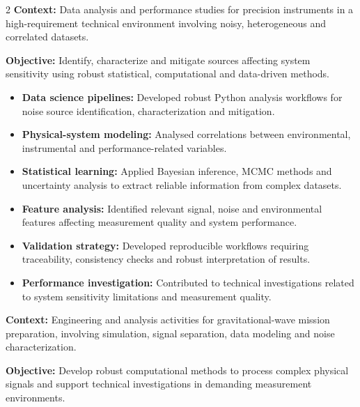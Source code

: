 \documentclass[8pt,a4paper,ragged2e,withhyper]{altacv}
\begin{document}
\begin{paracol}{2}
\textbf{Context:} Data analysis and performance studies for precision instruments in a high-requirement technical environment involving noisy, heterogeneous and correlated datasets.

\textbf{Objective:} Identify, characterize and mitigate sources affecting system sensitivity using robust statistical, computational and data-driven methods.

\begin{itemize}
\item \textbf{Data science pipelines:} Developed robust Python analysis workflows for noise source identification, characterization and mitigation.
\item \textbf{Physical-system modeling:} Analysed correlations between environmental, instrumental and performance-related variables.
\item \textbf{Statistical learning:} Applied Bayesian inference, MCMC methods and uncertainty analysis to extract reliable information from complex datasets.
\item \textbf{Feature analysis:} Identified relevant signal, noise and environmental features affecting measurement quality and system performance.
\item \textbf{Validation strategy:} Developed reproducible workflows requiring traceability, consistency checks and robust interpretation of results.
\item \textbf{Performance investigation:} Contributed to technical investigations related to system sensitivity limitations and measurement quality.
\end{itemize}

\divider


\textbf{Context:} Engineering and analysis activities for gravitational-wave mission preparation, involving simulation, signal separation, data modeling and noise characterization.

\textbf{Objective:} Develop robust computational methods to process complex physical signals and support technical investigations in demanding measurement environments.


\end{paracol}
\end{document}
